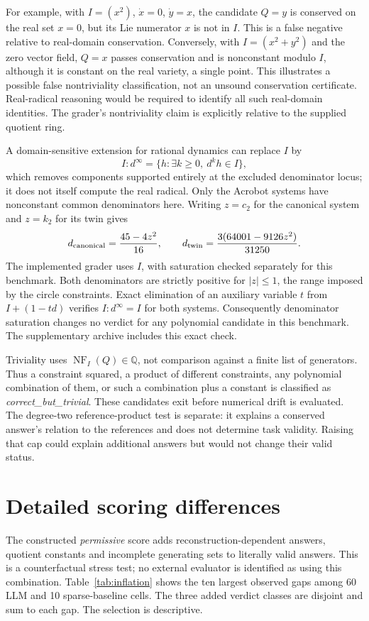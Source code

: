 \documentclass[10pt]{article}
\newcommand{\NF}{\operatorname{NF}}
\newcommand{\Q}{\mathbb{Q}}
\begin{document}
For example, with $I=(x^2)$, $\dot x=0$, $\dot y=x$, the candidate $Q=y$ is conserved on the real set $x=0$, but its Lie numerator $x$ is not in $I$. This is a false negative relative to real-domain conservation. Conversely, with $I=(x^2+y^2)$ and the zero vector field, $Q=x$ passes conservation and is nonconstant modulo $I$, although it is constant on the real variety, a single point. This illustrates a possible false nontriviality classification, not an unsound conservation certificate. Real-radical reasoning would be required to identify all such real-domain identities. The grader's nontriviality claim is explicitly relative to the supplied quotient ring.

A domain-sensitive extension for rational dynamics can replace $I$ by
\[
I:d^\infty=\{h:\exists k\ge0,\ d^k h\in I\},
\]
which removes components supported entirely at the excluded denominator locus; it does not itself compute the real radical. Only the Acrobot systems have nonconstant common denominators here. Writing $z=c_2$ for the canonical system and $z=k_2$ for its twin gives
\[
d_{\rm canonical}=\frac{45-4z^2}{16},\qquad
d_{\rm twin}=\frac{3(64001-9126z^2)}{31250}.
\]
The implemented grader uses $I$, with saturation checked separately for this benchmark. Both denominators are strictly positive for $|z|\le1$, the range imposed by the circle constraints. Exact elimination of an auxiliary variable $t$ from $I+(1-td)$ verifies $I:d^\infty=I$ for both systems. Consequently denominator saturation changes no verdict for any polynomial candidate in this benchmark. The supplementary archive includes this exact check.

Triviality uses $\NF_I(Q)\in\Q$, not comparison against a finite list of generators. Thus a constraint squared, a product of different constraints, any polynomial combination of them, or such a combination plus a constant is classified as \emph{correct\_but\_trivial}. These candidates exit before numerical drift is evaluated. The degree-two reference-product test is separate: it explains a conserved answer's relation to the references and does not determine task validity. Raising that cap could explain additional answers but would not change their valid status.

\section{Detailed scoring differences}\label{app:scoring}

The constructed \emph{permissive} score adds reconstruction-dependent answers, quotient constants and incomplete generating sets to literally valid answers. This is a counterfactual stress test; no external evaluator is identified as using this combination. Table~\ref{tab:inflation} shows the ten largest observed gaps among 60 LLM and 10 sparse-baseline cells. The three added verdict classes are disjoint and sum to each gap. The selection is descriptive.
\end{document}
